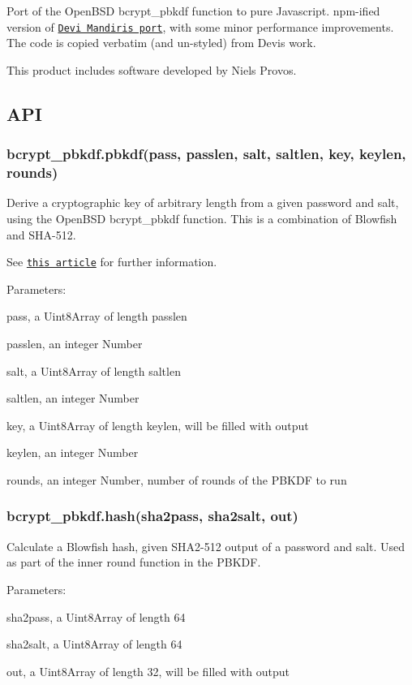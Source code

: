 Port of the Open\+B\+SD {\ttfamily bcrypt\+\_\+pbkdf} function to pure Javascript. {\ttfamily npm}-\/ified version of \href{https://github.com/devi/tmp/blob/master/js/bcrypt_pbkdf.js}{\tt Devi Mandiri\textquotesingle{}s port}, with some minor performance improvements. The code is copied verbatim (and un-\/styled) from Devi\textquotesingle{}s work.

This product includes software developed by Niels Provos.

\subsection*{A\+PI}

\subsubsection*{{\ttfamily bcrypt\+\_\+pbkdf.\+pbkdf(pass, passlen, salt, saltlen, key, keylen, rounds)}}

Derive a cryptographic key of arbitrary length from a given password and salt, using the Open\+B\+SD {\ttfamily bcrypt\+\_\+pbkdf} function. This is a combination of Blowfish and S\+H\+A-\/512.

See \href{http://www.tedunangst.com/flak/post/bcrypt-pbkdf}{\tt this article} for further information.

Parameters\+:


\begin{DoxyItemize}
\item {\ttfamily pass}, a Uint8\+Array of length {\ttfamily passlen}
\item {\ttfamily passlen}, an integer Number
\item {\ttfamily salt}, a Uint8\+Array of length {\ttfamily saltlen}
\item {\ttfamily saltlen}, an integer Number
\item {\ttfamily key}, a Uint8\+Array of length {\ttfamily keylen}, will be filled with output
\item {\ttfamily keylen}, an integer Number
\item {\ttfamily rounds}, an integer Number, number of rounds of the P\+B\+K\+DF to run
\end{DoxyItemize}

\subsubsection*{{\ttfamily bcrypt\+\_\+pbkdf.\+hash(sha2pass, sha2salt, out)}}

Calculate a Blowfish hash, given S\+H\+A2-\/512 output of a password and salt. Used as part of the inner round function in the P\+B\+K\+DF.

Parameters\+:


\begin{DoxyItemize}
\item {\ttfamily sha2pass}, a Uint8\+Array of length 64
\item {\ttfamily sha2salt}, a Uint8\+Array of length 64
\item {\ttfamily out}, a Uint8\+Array of length 32, will be filled with output 
\end{DoxyItemize}